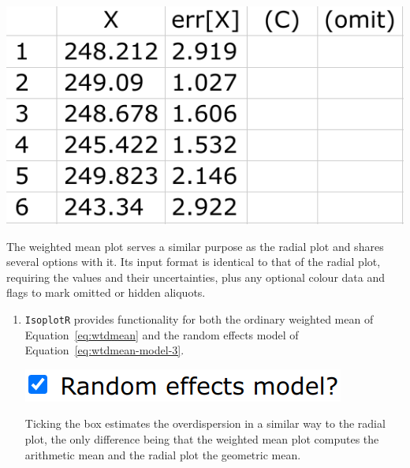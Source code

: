 \begin{refsection}
\noindent\begin{minipage}[t]{.32\linewidth}
  \strut\vspace*{-\baselineskip}\newline
  \includegraphics[width=\linewidth]{../figures/OtherWtdMeanData.png}
\end{minipage}
\begin{minipage}[t]{.68\linewidth}
The weighted mean plot serves a similar purpose as the radial plot and
shares several options with it. Its input format is identical to that
of the radial plot, requiring the values and their uncertainties, plus
any optional colour data and flags to mark omitted or hidden aliquots.
\end{minipage}

\begin{enumerate}

\item \texttt{IsoplotR} provides functionality for both the ordinary
  weighted mean of Equation~\ref{eq:wtdmean} and the random effects
  model of Equation~\ref{eq:wtdmean-model-3}.

\noindent\begin{minipage}[t]{.27\linewidth}
\strut\vspace*{-\baselineskip}\newline
  \includegraphics[width=\linewidth]{../figures/OtherWtdMeanRandomEffects.png}
\end{minipage}
\begin{minipage}[t]{.73\linewidth}
  Ticking the box estimates the overdispersion in a similar way to the
  radial plot, the only difference being that the weighted mean plot
  computes the arithmetic mean and the radial plot the geometric mean.
\end{minipage}


\end{enumerate}
\end{refsection}
